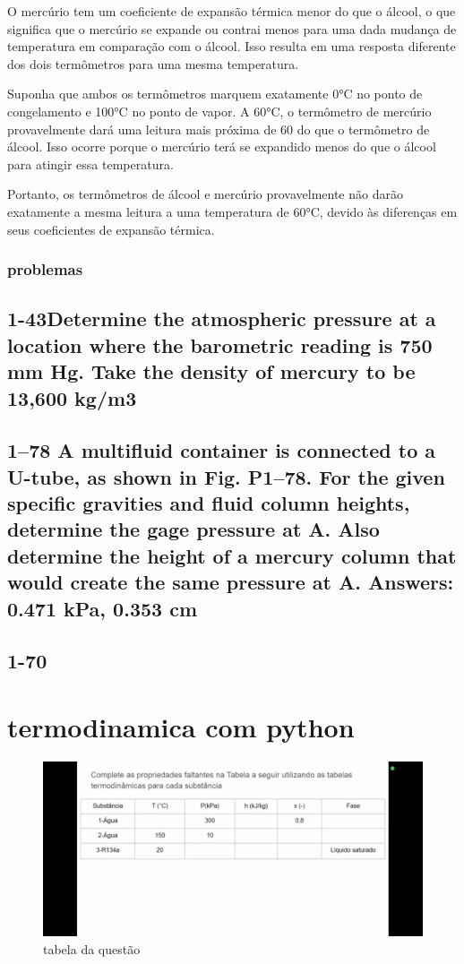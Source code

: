 \documentclass{article}
\begin{document}
O mercúrio tem um coeficiente de expansão térmica menor do que o álcool, o que significa que o mercúrio se expande ou contrai menos para uma dada mudança de temperatura em comparação com o álcool. Isso resulta em uma resposta diferente dos dois termômetros para uma mesma temperatura.

Suponha que ambos os termômetros marquem exatamente 0°C no ponto de congelamento e 100°C no ponto de vapor. A 60°C, o termômetro de mercúrio provavelmente dará uma leitura mais próxima de 60 do que o termômetro de álcool. Isso ocorre porque o mercúrio terá se expandido menos do que o álcool para atingir essa temperatura.

Portanto, os termômetros de álcool e mercúrio provavelmente não darão exatamente a mesma leitura a uma temperatura de 60°C, devido às diferenças em seus coeficientes de expansão térmica.

\subsubsection{problemas}
\subsection*{1-43Determine the atmospheric pressure at a location where the barometric reading is 750 mm Hg. Take the density of mercury to be 13,600 kg/m3}
\subsection*{1–78 A multifluid container is connected to a U-tube, as shown in Fig. P1–78. For the given specific gravities and fluid column heights, determine the gage pressure at A. Also determine the height of a mercury column that would create the same pressure at A. Answers: 0.471 kPa, 0.353 cm}
\subsection*{1-70}


\section{ termodinamica com python}
\begin{figure}[h]
    \centering
    \includegraphics[width=1\linewidth]{table.jpg}
    \caption{tabela da questão}
    \label{fig:tabela da questão}
  \end{figure}
\end{document}
